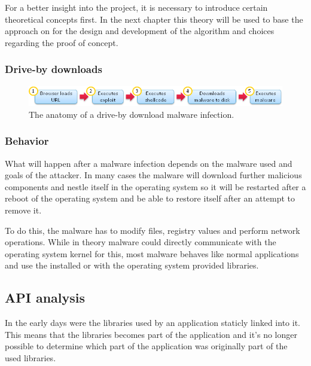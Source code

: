 For a better insight into the project, it is necessary to introduce certain theoretical concepts first. In the next chapter this theory will be used to base the approach on for the design and development of the algorithm and choices regarding the proof of concept.

\subsubsection{Drive-by downloads}

\begin{figure}
    \centering
    \includegraphics[width=12cm]{Images/drive-by-download.png}
    \caption{The anatomy of a drive-by download malware infection. \cite{http://blog.armorize.com/2011/04/newest-adobe-flash-0-day-used-in-new.html (modified)}}
    \label{fig:dbdownload}
\end{figure}

\subsubsection{Behavior}

What will happen after a malware infection depends on the malware used and goals of the attacker. In many cases the malware will download further malicious components and nestle itself in the operating system so it will be restarted after a reboot of the operating system and be able to restore itself after an attempt to remove it.

To do this, the malware has to modify files, registry values  and perform network operations. While in theory malware could directly communicate with the operating system kernel for this, most malware behaves like normal applications and use the installed or with the operating system provided libraries.

\subsection{API analysis}

In the early days were the libraries used by an application staticly linked into it. This means that the libraries becomes part of the application and it's no longer possible to determine which part of the application was originally part of the used libraries.

